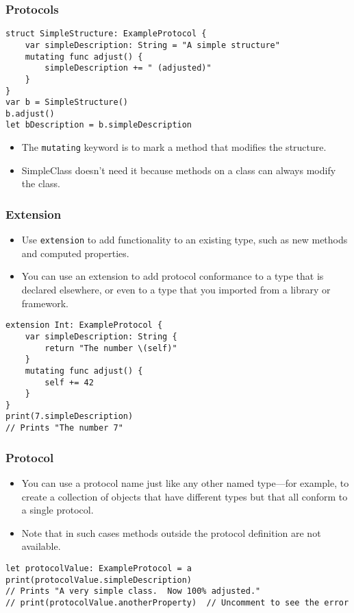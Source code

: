 \begin{frame}[fragile] \frametitle{Protocols}

\begin{lstlisting}[basicstyle=\scriptsize]
struct SimpleStructure: ExampleProtocol {
    var simpleDescription: String = "A simple structure"
    mutating func adjust() {
        simpleDescription += " (adjusted)"
    }
}
var b = SimpleStructure()
b.adjust()
let bDescription = b.simpleDescription
\end{lstlisting}

\begin{itemize}
\item The \lstinline|mutating| keyword is to mark a method that modifies the structure. 
\item SimpleClass doesn’t need it because methods on a class can always modify the class.
\end{itemize}

\end{frame}


\begin{frame}[fragile] \frametitle{Extension}

\begin{itemize}
\item Use \lstinline|extension| to add functionality to an existing type, such as new methods and computed properties. 
\item You can use an extension to add protocol conformance to a type that is declared elsewhere, or even to a type that you imported from a library or framework.
\end{itemize}

\begin{lstlisting}[basicstyle=\scriptsize]
extension Int: ExampleProtocol {
    var simpleDescription: String {
        return "The number \(self)"
    }
    mutating func adjust() {
        self += 42
    }
}
print(7.simpleDescription)
// Prints "The number 7"
\end{lstlisting}
\end{frame}

\begin{frame}[fragile] \frametitle{Protocol}

\begin{itemize}
\item You can use a protocol name just like any other named type—for example, to create a collection of objects that have different types but that all conform to a single protocol.
\item Note that in such cases methods outside the protocol definition are not available.
\end{itemize}

\begin{lstlisting}[basicstyle=\scriptsize]
let protocolValue: ExampleProtocol = a
print(protocolValue.simpleDescription)
// Prints "A very simple class.  Now 100% adjusted."
// print(protocolValue.anotherProperty)  // Uncomment to see the error
\end{lstlisting}
\end{frame}

